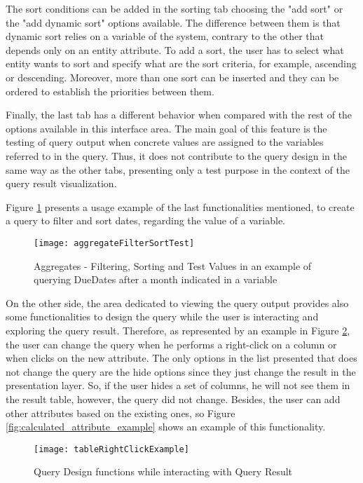 The sort conditions can be added in the sorting tab choosing the "add sort" or the "add dynamic sort" options available. The difference between them is that dynamic sort relies on a variable of the system, contrary to the other that depends only on an entity attribute. To add a sort, the user has to select what entity wants to sort and specify what are the sort criteria, for example, ascending or descending. Moreover, more than one sort can be inserted and they can be ordered to establish the priorities between them.

Finally, the last tab has a different behavior when compared with the rest of the options available in this interface area. The main goal of this feature is the testing of query output when concrete values are assigned to the variables referred to in the query. Thus, it does not contribute to the query design in the same way as the other tabs, presenting only a test purpose in the context of the query result visualization.

Figure \ref{fig:aggregates_filter_sort_test} presents a usage example of the last functionalities mentioned, to create a query to filter and sort dates, regarding the value of a variable.

\begin{figure}[htbp]
	\centering
	\texttt{[image: aggregateFilterSortTest]}
	\caption{Aggregates - Filtering, Sorting and Test Values in an example of querying DueDates after a month indicated in a variable}
	\label{fig:aggregates_filter_sort_test}
\end{figure}

On the other side, the area dedicated to viewing the query output provides also some functionalities to design the query while the user is interacting and exploring the query result. Therefore, as represented by an example in Figure \ref{fig:table_right_click_example}, the user can change the query when he performs a right-click on a column or when clicks on the new attribute. The only options in the list presented that does not change the query are the hide options since they just change the result in the presentation layer. So, if the user hides a set of columns, he will not see them in the result table, however, the query did not change. Besides, the user can add other attributes based on the existing ones, so Figure \ref{fig:calculated_attribute_example} shows an example of this functionality.

\begin{figure}[htbp]
	\centering
	\texttt{[image: tableRightClickExample]}
	\caption{Query Design functions while interacting with Query Result}
	\label{fig:table_right_click_example}
\end{figure}

